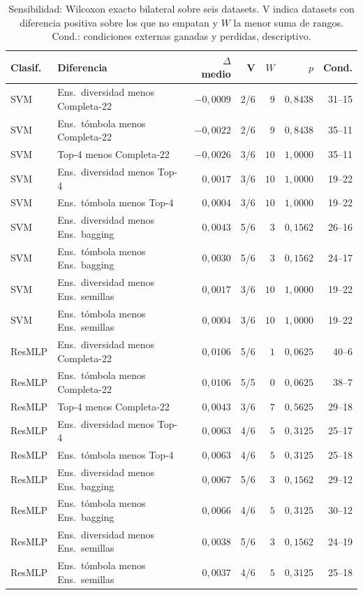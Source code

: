 \begin{table}[H]
\centering\fontsize{8}{10}\selectfont\setlength{\tabcolsep}{3.0pt}
\caption{Sensibilidad: Wilcoxon exacto bilateral sobre seis datasets. V indica datasets con diferencia positiva sobre los que no empatan y $W$ la menor suma de rangos. Cond.: condiciones externas ganadas y perdidas, descriptivo.}
\label{tab:sel-sensitivity}
\begin{tabular}{@{}llrrrrr@{}}
\toprule
Clasif. & Diferencia & $\Delta$ medio & V & $W$ & $p$ & Cond. \\
\midrule
SVM & Ens.\ diversidad menos Completa-22 & $-0{,}0009$ & 2/6 & $9$ & $0{,}8438$ & 31--15 \\
SVM & Ens.\ tómbola menos Completa-22 & $-0{,}0022$ & 2/6 & $9$ & $0{,}8438$ & 35--11 \\
SVM & Top-4 menos Completa-22 & $-0{,}0026$ & 3/6 & $10$ & $1{,}0000$ & 35--11 \\
SVM & Ens.\ diversidad menos Top-4 & $0{,}0017$ & 3/6 & $10$ & $1{,}0000$ & 19--22 \\
SVM & Ens.\ tómbola menos Top-4 & $0{,}0004$ & 3/6 & $10$ & $1{,}0000$ & 19--22 \\
SVM & Ens.\ diversidad menos Ens.\ bagging & $0{,}0043$ & 5/6 & $3$ & $0{,}1562$ & 26--16 \\
SVM & Ens.\ tómbola menos Ens.\ bagging & $0{,}0030$ & 5/6 & $3$ & $0{,}1562$ & 24--17 \\
SVM & Ens.\ diversidad menos Ens.\ semillas & $0{,}0017$ & 3/6 & $10$ & $1{,}0000$ & 19--22 \\
SVM & Ens.\ tómbola menos Ens.\ semillas & $0{,}0004$ & 3/6 & $10$ & $1{,}0000$ & 19--22 \\
ResMLP & Ens.\ diversidad menos Completa-22 & $0{,}0106$ & 5/6 & $1$ & $0{,}0625$ & 40--6 \\
ResMLP & Ens.\ tómbola menos Completa-22 & $0{,}0106$ & 5/5 & $0$ & $0{,}0625$ & 38--7 \\
ResMLP & Top-4 menos Completa-22 & $0{,}0043$ & 3/6 & $7$ & $0{,}5625$ & 29--18 \\
ResMLP & Ens.\ diversidad menos Top-4 & $0{,}0063$ & 4/6 & $5$ & $0{,}3125$ & 25--17 \\
ResMLP & Ens.\ tómbola menos Top-4 & $0{,}0063$ & 4/6 & $5$ & $0{,}3125$ & 25--18 \\
ResMLP & Ens.\ diversidad menos Ens.\ bagging & $0{,}0067$ & 5/6 & $3$ & $0{,}1562$ & 29--12 \\
ResMLP & Ens.\ tómbola menos Ens.\ bagging & $0{,}0066$ & 4/6 & $5$ & $0{,}3125$ & 30--12 \\
ResMLP & Ens.\ diversidad menos Ens.\ semillas & $0{,}0038$ & 5/6 & $3$ & $0{,}1562$ & 24--19 \\
ResMLP & Ens.\ tómbola menos Ens.\ semillas & $0{,}0037$ & 4/6 & $5$ & $0{,}3125$ & 25--18 \\
\bottomrule
\end{tabular}
\end{table}
